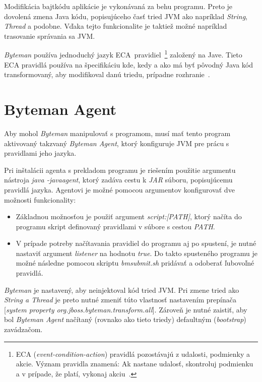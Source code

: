\documentclass[11pt,final,oneside]{fithesis}
\begin{document}
Modifikácia bajtkódu aplikácie je vykonávaná za behu programu. Preto je 
dovolená zmena Java kódu, popisujúceho časť tried JVM ako napríklad
\textit{String}, \textit{Thread} a podobne. Vďaka tejto funkcionalite je 
taktiež možné napríklad trasovanie správania sa JVM.

\textit{Byteman} používa jednoduchý jazyk
ECA~pravidiel~\footnote{ECA (\textit{event-condition-action}) pravidlá 
pozostávajú z udalosti, podmienky a akcie. Význam pravidla znamená: Ak nastane 
udalosť, skontroluj podmienku a v prípade, že platí, vykonaj
akciu~\cite{Sellis:ECARules}.} založený na Jave. Tieto ECA pravidlá
používa na špecifikáciu kde, kedy a ako má byť pôvodný Java kód transformovaný,
aby modifikoval danú triedu, prípadne rozhranie~\cite{RedHat:Byteman}.

\section{Byteman Agent}

Aby mohol \textit{Byteman} manipulovať s programom, musí mať tento program 
aktivovaný takzvaný \textit{Byteman Agent}, ktorý konfiguruje JVM pre prácu s 
pravidlami jeho jazyka.

Pri inštalácii agenta s prekladom programu je riešením použitie argumentu
nástroja \textit{java -javaagent}, ktorý zadáva cestu k \textit{JAR} súboru,
popisujúcemu pravidlá jazyka. Agentovi je možné pomocou argumentov
konfigurovať dve možnosti funkcionality:

\begin{itemize}
\item Základnou možnosťou je použiť argument \textit{script:[PATH]}, ktorý
načíta do programu skript definovaný pravidlami v súbore s cestou
\textit{PATH}.
\item V prípade potreby načítavania pravidiel do programu aj po spustení, je 
nutné nastaviť argument \textit{listener} na hodnotu \textit{true}. Do takto
spusteného programu je možné následne pomocou skriptu \textit{bmsubmit.sh}
pridávať a odoberať ľubovoľné pravidlá.
\end{itemize}

\textit{Byteman} je nastavený, aby neinjektoval kód tried JVM. Pri zmene tried
ako \textit{String a Thread} je preto nutné zmeniť túto vlastnosť
nastavením prepínača
[\textit{system property org.jboss.byteman.transform.all}]. Zároveň je
nutné zaistiť, aby bol \textit{Byteman Agent} načítaný (rovnako ako tieto 
triedy) defaultným (\textit{bootstrap}) zavádzačom.
\end{document}

